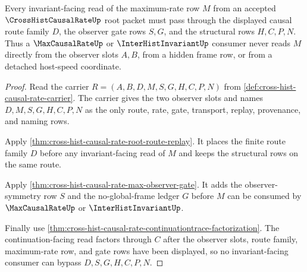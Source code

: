 \begin{theorem}
\label{thm:cross-hist-causal-rate-root-observer-gate-totality}
Every invariant-facing read of the maximum-rate row $M$ from an accepted $\CrossHistCausalRateUp$ root packet must pass through the displayed causal route family $D$, the observer gate rows $S,G$, and the structural rows $H,C,P,N$. Thus a $\MaxCausalRateUp$ or $\InterHistInvariantUp$ consumer never reads $M$ directly from the observer slots $A,B$, from a hidden frame row, or from a detached host-speed coordinate.
\end{theorem}
\begin{proof}
Read the carrier $R=(A,B,D,M,S,G,H,C,P,N)$ from \autoref{def:cross-hist-causal-rate-carrier}. The carrier gives the two observer slots and names $D,M,S,G,H,C,P,N$ as the only route, rate, gate, transport, replay, provenance, and naming rows.

Apply \autoref{thm:cross-hist-causal-rate-root-route-replay}. It places the finite route family $D$ before any invariant-facing read of $M$ and keeps the structural rows on the same route.

Apply \autoref{thm:cross-hist-causal-rate-max-observer-gate}. It adds the observer-symmetry row $S$ and the no-global-frame ledger $G$ before $M$ can be consumed by $\MaxCausalRateUp$ or $\InterHistInvariantUp$.

Finally use \autoref{thm:cross-hist-causal-rate-continuationtrace-factorization}. The continuation-facing read factors through $C$ after the observer slots, route family, maximum-rate row, and gate rows have been displayed, so no invariant-facing consumer can bypass $D,S,G,H,C,P,N$.
\end{proof}

